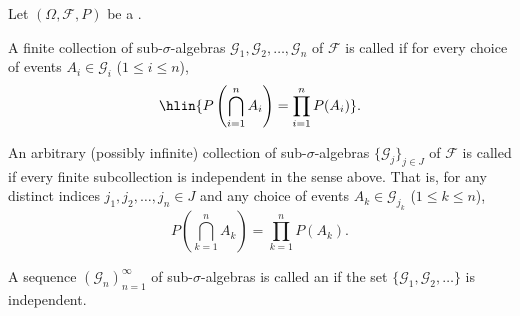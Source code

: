 \begin{definition} \label{definition:independence_of_sigma_algebras}
Let $(\Omega, \mathcal{F}, P)$ be a .

A finite collection of sub-$\sigma$-algebras $\mathcal{G}_1, \mathcal{G}_2, \dots, \mathcal{G}_n$ of $\mathcal{F}$ is called  if for every choice of events $A_i \in \mathcal{G}_i$ ($1 \leq i \leq n$),
$$\hlin{P\left(\bigcap_{i=1}^n A_i\right) = \prod_{i=1}^n P(A_i)}.$$

An arbitrary (possibly infinite) collection of sub-$\sigma$-algebras $\{\mathcal{G}_j\}_{j \in J}$ of $\mathcal{F}$ is called  if every finite subcollection is independent in the sense above. That is, for any distinct indices $j_1, j_2, \dots, j_n \in J$ and any choice of events $A_k \in \mathcal{G}_{j_k}$ ($1 \leq k \leq n$),
$$P\left(\bigcap_{k=1}^n A_k\right) = \prod_{k=1}^n P(A_k).$$

A sequence $(\mathcal{G}_n)_{n=1}^\infty$ of sub-$\sigma$-algebras is called an  if the set $\{\mathcal{G}_1, \mathcal{G}_2, \dots\}$ is independent.
\end{definition}

